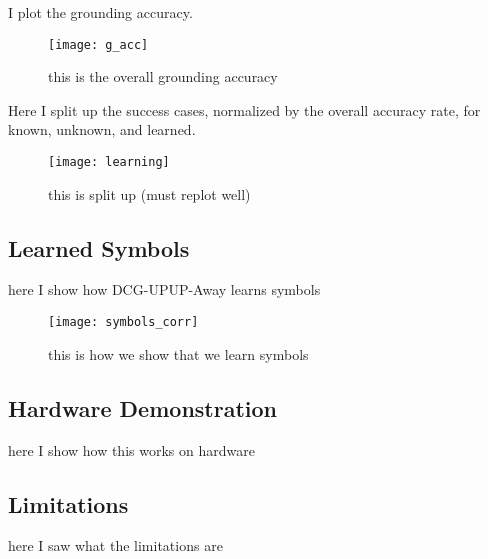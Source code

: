 I plot the grounding accuracy.
\begin{figure}[h]
\centering
\texttt{[image: g\_acc]}
\caption{this is the overall grounding accuracy}
\label{fig:g_acc}
\end{figure}

Here I split up the success cases, normalized by the overall accuracy rate, for known, unknown, and learned.
\begin{figure}[h]
\centering
\texttt{[image: learning]}
\caption{this is split up (must replot well)}
\label{fig:g_acc}
\end{figure}


\subsection{Learned Symbols}
here I show how DCG-UPUP-Away learns symbols
\begin{figure}[h]
\centering
\texttt{[image: symbols\_corr]}
\caption{this is how we show that we learn symbols}
\label{fig:g_acc}
\end{figure}

\subsection{Hardware Demonstration}
here I show how this works on hardware

\subsection{Limitations}
here I saw what the limitations are